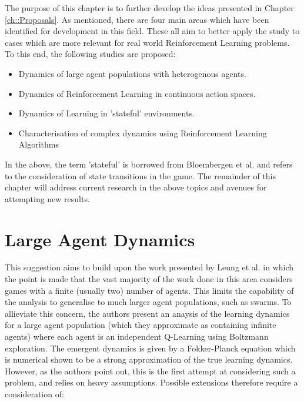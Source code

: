 \documentclass[../sample.tex]{subfiles}
\begin{document}
    The purpose of this chapter is to further develop the ideas presented in Chapter
    \ref{ch::Proposals}. As mentioned, there are four main areas which have been identified for
    development in this field. These all aim to better apply the study to cases which are more
    relevant for real world Reinforcement Learning problems. To this end, the following studies are
    proposed:
    
    \begin{itemize}
        \item Dynamics of large agent populations with heterogenous agents.
        \item Dynamics of Reinforcement Learning in continuous action spaces.
        \item Dynamics of Learning in 'stateful' environments.
        \item Characterisation of complex dynamics using Reinforcement Learning Algorithms
    \end{itemize}

    In the above, the term 'stateful' is borrowed from Bloembergen et al. \cite{Bloembergen2015} and
   refers to the consideration of state transitions in the game. The remainder of this chapter will
   address current research in the above topics and avenues for attempting new results.
   
   \section{Large Agent Dynamics}

    This suggestion aims to build upon the work presented by Leung et
    al. \cite{Hu2019} in which the point is made that the vast
    majority of the work done in this area considers games with a
    finite (usually two) number of agents. This limits the capability
    of the analysis to generalise to much larger agent populations,
    such as swarms. To allieviate this concern, the authors present an
    anaysis of the learning dynamics for a large agent population
    (which they approximate as containing infinite agents) where each
    agent is an independent Q-Learning using Boltzmann
    exploration. The emergent dynamics is given by a Fokker-Planck
    equation which is numerical shown to be a strong approximation of
    the true learning dynamics. However, as the authors point out,
    this is the first attempt at considering such a problem, and
    relies on heavy assumptions.  Possible extensions therefore
    require a consideration of:
\end{document}
